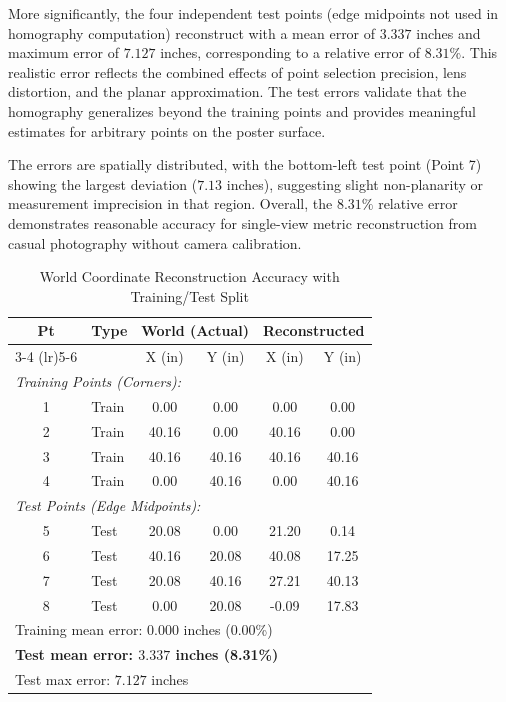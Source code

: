 More significantly, the four independent test points (edge midpoints not used in homography computation) reconstruct with a mean error of $3.337$ inches and maximum error of $7.127$ inches, corresponding to a relative error of $8.31\%$. This realistic error reflects the combined effects of point selection precision, lens distortion, and the planar approximation. The test errors validate that the homography generalizes beyond the training points and provides meaningful estimates for arbitrary points on the poster surface.

The errors are spatially distributed, with the bottom-left test point (Point 7) showing the largest deviation ($7.13$ inches), suggesting slight non-planarity or measurement imprecision in that region. Overall, the $8.31\%$ relative error demonstrates reasonable accuracy for single-view metric reconstruction from casual photography without camera calibration.

\begin{table}[htbp]
    \caption{World Coordinate Reconstruction Accuracy with Training/Test Split}
    \label{tab:reconstruction}
    \centering
    \small
    \begin{tabular}{clcccc}
        \toprule
        Pt & Type & \multicolumn{2}{c}{World (Actual)} & \multicolumn{2}{c}{Reconstructed} \\
        \cmidrule(lr){3-4} \cmidrule(lr){5-6}
        & & X (in) & Y (in) & X (in) & Y (in) \\
        \midrule
        \multicolumn{6}{l}{\textit{Training Points (Corners):}} \\
        1 & Train & 0.00 & 0.00 & 0.00 & 0.00 \\
        2 & Train & 40.16 & 0.00 & 40.16 & 0.00 \\
        3 & Train & 40.16 & 40.16 & 40.16 & 40.16 \\
        4 & Train & 0.00 & 40.16 & 0.00 & 40.16 \\
        \midrule
        \multicolumn{6}{l}{\textit{Test Points (Edge Midpoints):}} \\
        5 & Test & 20.08 & 0.00 & 21.20 & 0.14 \\
        6 & Test & 40.16 & 20.08 & 40.08 & 17.25 \\
        7 & Test & 20.08 & 40.16 & 27.21 & 40.13 \\
        8 & Test & 0.00 & 20.08 & -0.09 & 17.83 \\
        \midrule
        \multicolumn{6}{l}{Training mean error: $0.000$ inches (0.00\%)} \\
        \multicolumn{6}{l}{\textbf{Test mean error: $3.337$ inches (8.31\%)}} \\
        \multicolumn{6}{l}{Test max error: $7.127$ inches} \\
        \bottomrule
    \end{tabular}
\end{table}

